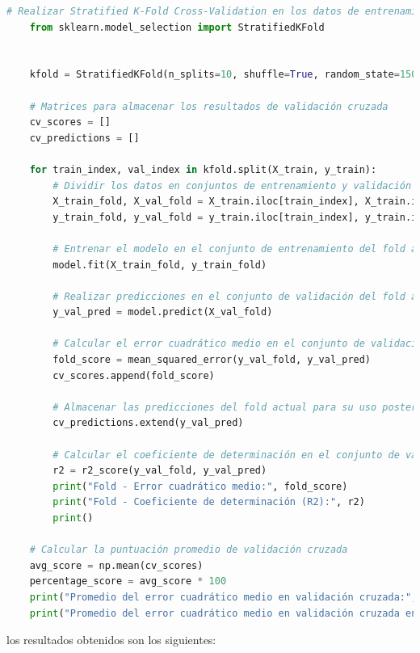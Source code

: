 \begin{lstlisting}[language=Python, caption=Realizar Stratified K-Fold Cross-Validation en los datos de entrenamiento, label=lst:skfold_train]
    # Realizar Stratified K-Fold Cross-Validation en los datos de entrenamiento
    from sklearn.model_selection import StratifiedKFold
    
    
    kfold = StratifiedKFold(n_splits=10, shuffle=True, random_state=1502)
    
    # Matrices para almacenar los resultados de validación cruzada
    cv_scores = []
    cv_predictions = []
    
    for train_index, val_index in kfold.split(X_train, y_train):
        # Dividir los datos en conjuntos de entrenamiento y validación
        X_train_fold, X_val_fold = X_train.iloc[train_index], X_train.iloc[val_index]
        y_train_fold, y_val_fold = y_train.iloc[train_index], y_train.iloc[val_index]
        
        # Entrenar el modelo en el conjunto de entrenamiento del fold actual
        model.fit(X_train_fold, y_train_fold)
    
        # Realizar predicciones en el conjunto de validación del fold actual
        y_val_pred = model.predict(X_val_fold)
    
        # Calcular el error cuadrático medio en el conjunto de validación del fold actual
        fold_score = mean_squared_error(y_val_fold, y_val_pred)
        cv_scores.append(fold_score)
    
        # Almacenar las predicciones del fold actual para su uso posterior
        cv_predictions.extend(y_val_pred)
    
        # Calcular el coeficiente de determinación en el conjunto de validación del fold actual
        r2 = r2_score(y_val_fold, y_val_pred)
        print("Fold - Error cuadrático medio:", fold_score)
        print("Fold - Coeficiente de determinación (R2):", r2)
        print()
    
    # Calcular la puntuación promedio de validación cruzada
    avg_score = np.mean(cv_scores)
    percentage_score = avg_score * 100
    print("Promedio del error cuadrático medio en validación cruzada:", avg_score)
    print("Promedio del error cuadrático medio en validación cruzada en %:", percentage_score)
\end{lstlisting}


los resultados obtenidos son los siguientes:


